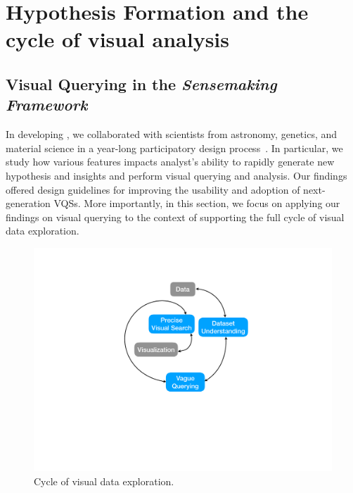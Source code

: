 \section{Hypothesis Formation and the cycle of visual analysis\label{sec:hypothesis}}
\subsection{Visual Querying in the \textit{Sensemaking Framework}}
In developing \zv, we collaborated with scientists from astronomy, genetics, and material science in a year-long participatory design process~\cite{Lee2017}. In particular, we study how various features impacts analyst's ability to rapidly generate new hypothesis and insights and perform visual querying and analysis. Our findings offered design guidelines for improving the usability and adoption of next-generation VQSs. More importantly, in this section, we focus on applying our findings on visual querying to the context of supporting the full cycle of visual data exploration. 
\begin{figure}[h!]
\label{fig:cycle}
\centering
\includegraphics[width=0.4\linewidth]{figures/cycle.pdf}
\caption{Cycle of visual data exploration.}
\end{figure}
